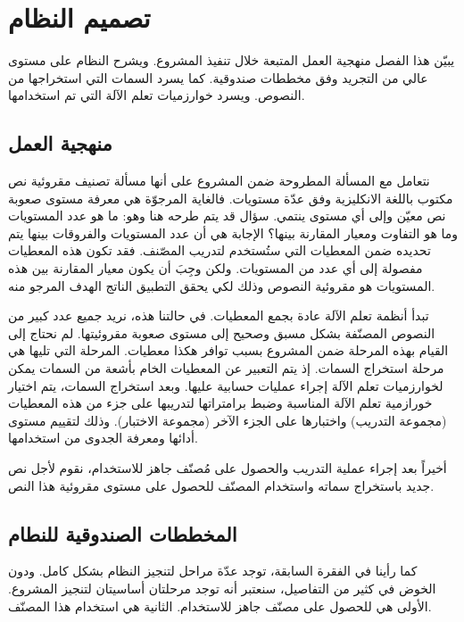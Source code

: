 

\chapter{تصميم النظام}
يبيّن هذا الفصل منهجية العمل المتبعة خلال تنفيذ المشروع.
ويشرح النظام على مستوى عالي من التجريد وفق مخططات صندوقية.
كما يسرد السمات التي استخراجها من النصوص.
ويسرد خوارزميات تعلم الآلة التي تم استخدامها.

\section{منهجية العمل}
\label{sec:sys:methedology}
نتعامل مع المسألة المطروحة ضمن المشروع على أنها مسألة تصنيف مقروئية نص مكتوب باللغة الانكليزية وفق عدّة مستويات.
فالغاية المرجوّة هي معرفة مستوى صعوبة نص معيّن وإلى أي مستوى ينتمي.
سؤال قد يتم طرحه هنا وهو: ما هو عدد المستويات وما هو التفاوت ومعيار المقارنة بينها؟
الإجابة هي أن عدد المستويات والفروقات بينها يتم تحديده ضمن المعطيات التي ستُستخدم لتدريب المصّنف.
فقد تكون هذه المعطيات مفصولة إلى أي عدد من المستويات.
ولكن وجِبَ أن يكون معيار المقارنة بين هذه المستويات هو مقروئية النصوص وذلك لكي يحقق التطبيق الناتج الهدف المرجو منه.

تبدأ أنظمة تعلم الآلة عادة بجمع المعطيات.
في حالتنا هذه، نريد جميع عدد كبير من النصوص المصنّفة بشكل مسبق وصحيح إلى مستوى صعوبة مقروئيتها.
لم نحتاج إلى القيام بهذه المرحلة ضمن المشروع بسبب توافر هكذا معطيات.
المرحلة التي تليها هي مرحلة استخراج السمات.
إذ يتم التعبير عن المعطيات الخام بأشعة من السمات يمكن لخوارزميات تعلم الآلة إجراء عمليات حسابية عليها.
وبعد استخراج السمات، يتم اختيار خورازمية تعلم الآلة المناسبة وضبط برامتراتها 
لتدريبها على جزء من هذه المعطيات (مجموعة التدريب) واختبارها على الجزء الآخر (مجموعة الاختبار).
وذلك لتقييم مستوى أدائها ومعرفة الجدوى من استخدامها.

أخيراً بعد إجراء عملية التدريب والحصول على مُصنّف جاهز للاستخدام،
نقوم لأجل نص جديد باستخراج سماته واستخدام المصنّف للحصول على مستوى مقروئية هذا النص.


\section{المخططات الصندوقية للنطام}
كما رأينا في الفقرة السابقة، توجد عدّة مراحل لتنجيز النظام بشكل كامل.
ودون الخوض في كثير من التفاصيل، سنعتبر أنه توجد مرحلتان أساسيتان لتنجيز المشروع.
الأولى هي للحصول على مصنّف جاهز للاستخدام.
الثانية هي استخدام هذا المصنّف.

